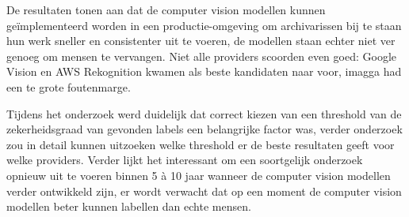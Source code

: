 De resultaten tonen aan dat de computer vision modellen kunnen geïmplementeerd worden in een productie-omgeving om archivarissen bij te staan hun werk sneller en consistenter uit te voeren, de modellen staan echter niet ver genoeg om mensen te vervangen. Niet alle providers scoorden even goed: Google Vision en AWS Rekognition kwamen als beste kandidaten naar voor, imagga had een te grote foutenmarge. 

Tijdens het onderzoek werd duidelijk dat correct kiezen van een threshold van de zekerheidsgraad van gevonden labels een belangrijke factor was, verder onderzoek zou in detail kunnen uitzoeken welke threshold er de beste resultaten geeft voor welke providers. Verder lijkt het interessant om een soortgelijk onderzoek opnieuw uit te voeren binnen 5 à 10 jaar wanneer de computer vision modellen verder ontwikkeld zijn, er wordt verwacht dat op een moment de computer vision modellen beter kunnen labellen dan echte mensen.

